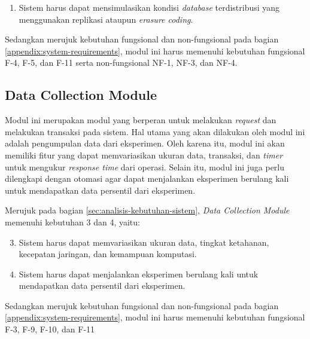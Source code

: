 \begin{enumerate}
    \item Sistem harus dapat mensimulasikan kondisi \textit{database} terdistribusi yang menggunakan replikasi ataupun \textit{erasure coding}.
\end{enumerate}

Sedangkan merujuk kebutuhan fungsional dan non-fungsional pada bagian \ref{appendix:system-requirements}, modul ini harus memenuhi kebutuhan fungsional F-4, F-5, dan F-11 serta non-fungsional NF-1, NF-3, dan NF-4.


\subsection{Data Collection Module}
Modul ini merupakan modul yang berperan untuk melakukan \textit{request} dan melakukan transaksi pada sistem. Hal utama yang akan dilakukan oleh modul ini adalah pengumpulan data dari eksperimen. Oleh karena itu, modul ini akan memiliki fitur yang dapat memvariasikan ukuran data, transaksi, dan \textit{timer} untuk mengukur \textit{response time} dari operasi. Selain itu, modul ini juga perlu dilengkapi dengan otomasi agar dapat menjalankan eksperimen berulang kali untuk mendapatkan data persentil dari eksperimen.

Merujuk pada bagian \ref{sec:analisis-kebutuhan-sistem}, \textit{Data Collection Module} memenuhi kebutuhan 3 dan 4, yaitu:

\begin{enumerate}
    \setcounter{enumi}{2}
    \item Sistem harus dapat memvariasikan ukuran data, tingkat ketahanan, kecepatan jaringan, dan kemampuan komputasi.
    \item Sistem harus dapat menjalankan eksperimen berulang kali untuk mendapatkan data persentil dari eksperimen.
\end{enumerate}

Sedangkan merujuk kebutuhan fungsional dan non-fungsional pada bagian \ref{appendix:system-requirements}, modul ini harus memenuhi kebutuhan fungsional F-3, F-9, F-10, dan F-11

